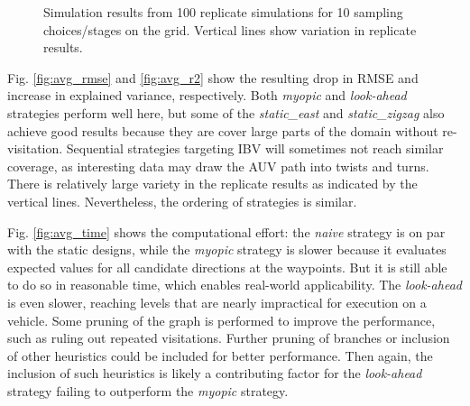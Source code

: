 \documentclass[aoas]{imsart}
\begin{document}
\begin{figure}[h!]
  \hfill 
\caption{Simulation results from 100 replicate simulations for 10
  sampling choices/stages on the grid. Vertical lines show variation in replicate results.}  
\label{fig:sim_results}
\end{figure}

Fig. \ref{fig:avg_rmse} and \ref{fig:avg_r2} show the resulting drop
in RMSE and increase in explained variance, respectively. Both
\textit{myopic} and \textit{look-ahead} strategies perform well here,
but some of the \textit{static\_east} and \textit{static\_zigzag} also
achieve good results because they are cover large
parts of the domain without re-visitation. Sequential strategies
targeting IBV will sometimes not reach similar coverage, as
interesting data may draw the AUV path into twists and turns. There is
relatively large variety in the replicate results as indicated by the
vertical lines. Nevertheless, the ordering of strategies is similar.


Fig. \ref{fig:avg_time} shows the computational effort: the
\textit{naive} strategy is on par with the static designs, while the
\textit{myopic} strategy is slower because it evaluates expected values for all candidate directions at the waypoints. But it is still able to do so in reasonable time, which enables real-world applicability. The \textit{look-ahead} is even
slower, reaching levels that are nearly impractical for execution on a
vehicle. Some pruning of the graph is performed to improve the
performance, such as ruling out repeated visitations. Further pruning of branches or
inclusion of other heuristics could be included for better
performance. Then again, the inclusion of such heuristics is likely a
contributing factor for the \textit{look-ahead} strategy failing to
outperform the \textit{myopic} strategy.
\end{document}
